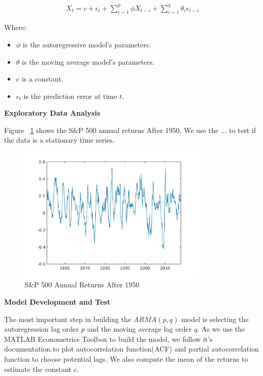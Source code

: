 \documentclass{article}
\begin{document}
\begin{align*}
    X_t=c+\epsilon_t+\sum_{i=1}^p\phi X_{t-i}+\sum_{i=1}^q\theta_i\epsilon_{t-i}
\end{align*}

Where:
\begin{itemize}
    \item $\phi$ is the autoregressive model's parameters.
    \item $\theta$ is the moving average model's parameters.
    \item c is a constant.
    \item $\epsilon_t$ is the prediction error at time $t$.
\end{itemize}

\textbf{Exploratory Data Analysis}

Figure ~\ref{fig:returns} shows the S\&P 500 annual returns After 1950. We use the ... to test if the data is a stationary time series. 

\begin{figure}[h!]
    \centering
        \includegraphics[width=0.8\textwidth]{sp500-annual-increase.jpg}
    \caption{S\&P 500 Annual Returns After 1950}
    \label{fig:returns}
\end{figure}

\vspace{\baselineskip}
\textbf{Model Development and Test}

The most important step in building the $ARMA(p, q)$ model is selecting the autoregression lag order $p$ and the moving average lag order $q$. As we use the MATLAB Econometrics Toolbox to build the model, we follow it's documentation\cite{lags} to plot autocorrelation function(ACF) and partial autocorrelation function to choose potential lags. We also compute the mean of the returns to estimate the constant $c$.
\end{document}
